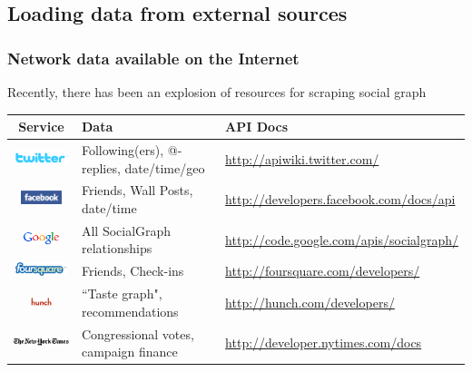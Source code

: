 \documentclass[xcolor=dvipsnames, 9pt]{beamer}
\begin{document}

\subsection{Loading data from external sources} %
\label{sub:loading_data_from_external_sources}

\begin{frame}[fragile]
    \frametitle{Network data available on the Internet}
    Recently, there has been an explosion of resources for scraping social graph
    \begin{table}
        \centering
        \scriptsize{
        \begin{tabular*}{.99\textwidth}{c|l|l}
        \textbf{Service} & \textbf{Data} & \textbf{API Docs} \\ \hline \hline
        \includegraphics[height=4mm]{../images/logos/twitter_logo.png} & Following(ers), @-replies, date/time/geo & \url{http://apiwiki.twitter.com/} \\ \hline
        \includegraphics[height=4mm]{../images/logos/facebook_logo.jpg} & Friends, Wall Posts, date/time & \url{http://developers.facebook.com/docs/api} \\ \hline
        \includegraphics[height=4mm]{../images/logos/Newgooglelogo.png} & All SocialGraph relationships & \url{http://code.google.com/apis/socialgraph/} \\ \hline
        \includegraphics[height=4mm]{../images/logos/foursquare.png} & Friends, Check-ins & \url{http://foursquare.com/developers/} \\ \hline
        \includegraphics[height=3mm]{../images/logos/Hunch_com_logo.png} & ``Taste graph", recommendations  & \url{http://hunch.com/developers/} \\ \hline
        \includegraphics[height=4mm]{../images/logos/nytlogo.png} & Congressional votes, campaign finance & \url{http://developer.nytimes.com/docs}

\end{tabular*}}
\end{table}
\end{frame}
\end{document}
